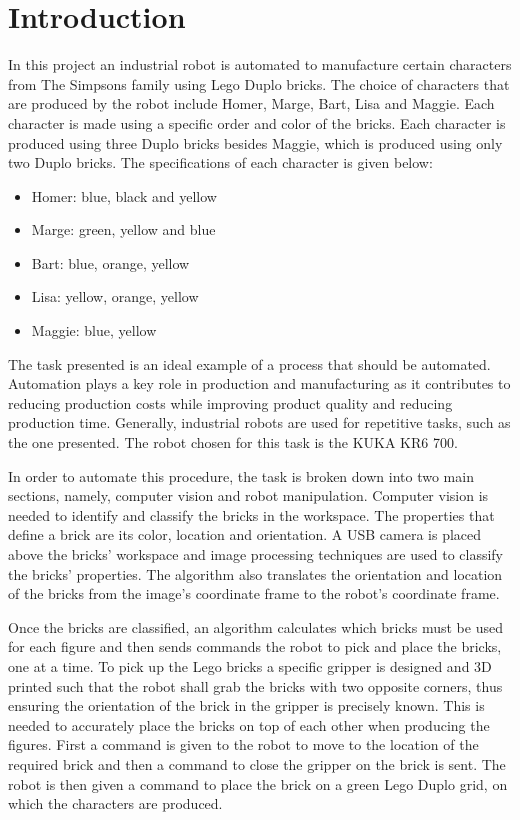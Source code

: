 \chapter{Introduction}\label{chap:introduction}
In this project an industrial robot is automated to manufacture certain characters from The Simpsons family using Lego Duplo bricks. The choice of characters that are produced by the robot include Homer, Marge, Bart, Lisa and Maggie. Each character is made using a specific order and color of the bricks. Each character is produced using three Duplo bricks besides Maggie, which is produced using only two Duplo bricks. The specifications of each character is given below:

\begin{itemize}
	\item Homer: blue, black and yellow
	\item Marge: green, yellow and blue
	\item Bart: blue, orange, yellow
	\item Lisa: yellow, orange, yellow
	\item Maggie: blue, yellow
\end{itemize}

The task presented is an ideal example of a process that should be automated. Automation plays a key role in production and manufacturing as it contributes to reducing production costs while improving product quality and reducing production time. Generally, industrial robots are used for repetitive tasks, such as the one presented. The robot chosen for this task is the KUKA KR6 700.

In order to automate this procedure, the task is broken down into two main sections, namely, computer vision and robot manipulation. Computer vision is needed to identify and classify the bricks in the workspace. The properties that define a brick are its color, location and orientation. A USB camera is placed above the bricks' workspace and image processing techniques are used to classify the bricks' properties. The algorithm also translates the orientation and location of the bricks from the image's coordinate frame to the robot's coordinate frame.

Once the bricks are classified, an algorithm calculates which bricks must be used for each figure and then sends commands the robot to pick and place the bricks, one at a time. To pick up the Lego bricks a specific gripper is designed and 3D printed such that the robot shall grab the bricks with two opposite corners, thus ensuring the orientation of the brick in the gripper is precisely known. This is needed to accurately place the bricks on top of each other when producing the figures. First a command is given to the robot to move to the location of the required brick and then a command to close the gripper on the brick is sent. The robot is then given a command to place the brick on a green Lego Duplo grid, on which the characters are produced.

